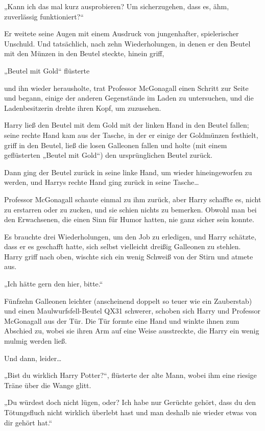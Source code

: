 {„Kann ich das mal kurz ausprobieren? Um sicherzugehen, dass es, ähm, zuverlässig funktioniert?“

Er weitete seine Augen mit einem Ausdruck von jungenhafter, spielerischer Unschuld. Und tatsächlich, nach zehn Wiederholungen, in denen er den Beutel mit den Münzen in den Beutel steckte, hinein griff,

„Beutel mit Gold“ flüsterte

und ihn wieder herausholte, trat Professor McGonagall einen Schritt zur Seite und begann, einige der anderen Gegenstände im Laden zu untersuchen, und die Ladenbesitzerin drehte ihren Kopf, um zuzusehen.

Harry ließ den Beutel mit dem Gold mit der linken Hand in den Beutel fallen; seine rechte Hand kam aus der Tasche, in der er einige der Goldmünzen festhielt, griff in den Beutel, ließ die losen Galleonen fallen und holte (mit einem geflüsterten „Beutel mit Gold“) den ursprünglichen Beutel zurück.

Dann ging der Beutel zurück in seine linke Hand, um wieder hineingeworfen zu werden, und Harrys rechte Hand ging zurück in seine Tasche…

Professor McGonagall schaute einmal zu ihm zurück, aber Harry schaffte es, nicht zu erstarren oder zu zucken, und sie schien nichts zu bemerken. Obwohl man bei den Erwachsenen, die einen Sinn für Humor hatten, nie ganz sicher sein konnte.

Es brauchte drei Wiederholungen, um den Job zu erledigen, und Harry schätzte, dass er es geschafft hatte, sich selbst vielleicht dreißig Galleonen zu stehlen. Harry griff nach oben, wischte sich ein wenig Schweiß von der Stirn und atmete aus.

„Ich hätte gern den hier, bitte.“

Fünfzehn Galleonen leichter (anscheinend doppelt so teuer wie ein Zauberstab) und einen Maulwurfsfell-Beutel QX31 schwerer, schoben sich Harry und Professor McGonagall aus der Tür. Die Tür formte eine Hand und winkte ihnen zum Abschied zu, wobei sie ihren Arm auf eine Weise ausstreckte, die Harry ein wenig mulmig werden ließ.

Und dann, leider…

„Bist du wirklich Harry Potter?“, flüsterte der alte Mann, wobei ihm eine riesige Träne über die Wange glitt.

„Du würdest doch nicht lügen, oder? Ich habe nur Gerüchte gehört, dass du den Tötungsfluch nicht wirklich überlebt hast und man deshalb nie wieder etwas von dir gehört hat.“

}
